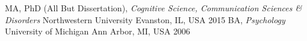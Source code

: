 
\vspace{0.5mm}
\begin{cventries}

  \cventry
    {MA, PhD (All But Dissertation), \textit{Cognitive Science, Communication Sciences \& Disorders}} %
    {Northwestern University} %
    {Evanston, IL, USA} %
    {2015} %
    {
    }
\vspace{-2.0mm}
  \cventry
    {BA, \textit{Psychology}} %
    {University of Michigan} %
    {Ann Arbor, MI, USA} %
    {2006} %
    {
    }
%

\end{cventries}
